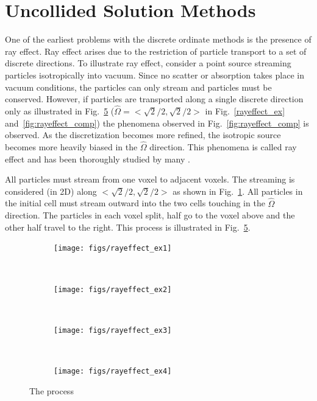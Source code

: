 \section{Uncollided Solution Methods}\label{sec:uncol}
One of the earliest problems with the discrete ordinate methods is the presence of ray effect. Ray effect arises due to the restriction of particle transport to a set of discrete directions. To illustrate ray effect, consider a point source streaming particles isotropically into vacuum. Since no scatter or absorption takes place in vacuum conditions, the particles can only stream and particles must be conserved. However, if particles are transported along a single discrete direction only as illustrated in Fig.~\ref{fig:rayeffect_ex} ($\hat{\Omega} = <\sqrt{2}/2, \sqrt{2}/2>$ in Fig.~\ref{rayeffect_ex} and~\ref{fig:rayeffect_comp}) the phenomena observed in Fig.~\ref{fig:rayeffect_comp} is observed. As the discretization becomes more refined, the isotropic source becomes more heavily biased in the $\hat{\Omega}$ direction. This phenomena is called ray effect and has been thoroughly studied by many \citep{ref:mathewsk} \citep{ref:tencerj}.

All particles must stream from one voxel to adjacent voxels. The streaming is considered (in 2D) along $<\sqrt{2}/2, \sqrt{2}/2>$ as shown in Fig.~\ref{fig:rayeffect_ex1}. All particles in the initial cell must stream outward into the two cells touching in the $\hat{\Omega}$ direction. The particles in each voxel split, half go to the voxel above and the other half travel to the right. This process is illustrated in Fig.~\ref{fig:rayeffect_ex}.

\begin{figure}
    \centering
    \begin{subfigure}[b]{0.2\textwidth}
        \texttt{[image: figs/rayeffect\_ex1]}
        \caption{}
        \label{fig:rayeffect_ex1}
    \end{subfigure}
    ~ 
    \begin{subfigure}[b]{0.2\textwidth}
        \texttt{[image: figs/rayeffect\_ex2]}
        \caption{}
        \label{fig:rayeffect_ex2}
    \end{subfigure}
    ~ 
    \begin{subfigure}[b]{0.2\textwidth}
        \texttt{[image: figs/rayeffect\_ex3]}
        \caption{}
        \label{fig:rayeffect_ex3}
    \end{subfigure}
    ~
    \begin{subfigure}[b]{0.2\textwidth}
        \texttt{[image: figs/rayeffect\_ex4]}
        \caption{}
        \label{fig:rayeffect_ex4}
    \end{subfigure}
    \caption{The process}\label{fig:rayeffect_ex}
\end{figure}

